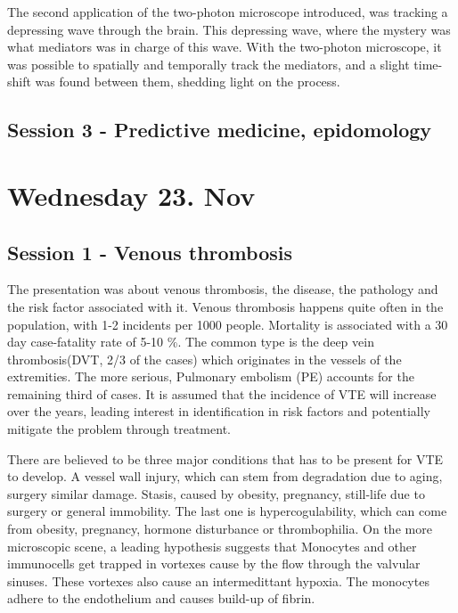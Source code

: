\documentclass[12p]{article}
\begin{document}
The second application of the two-photon microscope introduced, was tracking a depressing wave through the brain.
This depressing wave, where the mystery was what mediators was in charge of this wave.
With the two-photon microscope, it was possible to spatially and temporally track the mediators, and a slight time-shift was found between them, shedding light on the process.




\subsection*{Session 3 - Predictive medicine, epidomology}
\section*{Wednesday 23. Nov}
\subsection*{Session 1 - Venous thrombosis}

The presentation was about venous thrombosis, the disease, the pathology and the risk factor associated with it.
Venous thrombosis happens quite often in the population, with 1-2 incidents per 1000 people.
Mortality is associated with a 30 day case-fatality rate of 5-10 \%.
The common type is the deep vein thrombosis(DVT, 2/3 of the cases) which originates in the vessels of the extremities.
The more serious, Pulmonary embolism (PE) accounts for the remaining third of cases.
It is assumed that the incidence of VTE will increase over the years, leading interest in identification in risk factors and potentially mitigate the problem through treatment.

There are believed to be three major conditions that has to be present for VTE to develop.
A vessel wall injury, which can stem from degradation due to aging, surgery similar damage.
Stasis, caused by obesity, pregnancy, still-life due to surgery or general immobility.
The last one is hypercogulability, which can come from obesity, pregnancy, hormone disturbance or thrombophilia.
On the more microscopic scene, a leading hypothesis suggests that Monocytes and other immunocells get trapped in vortexes cause by the flow through the valvular sinuses.
These vortexes also cause an intermedittant hypoxia.
The monocytes adhere to the endothelium and causes build-up of fibrin.
\end{document}
